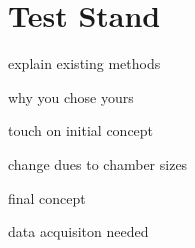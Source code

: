 \section{Test Stand}

explain existing methods

why you chose yours

touch on initial concept

change dues to chamber sizes

final concept

data acquisiton needed

